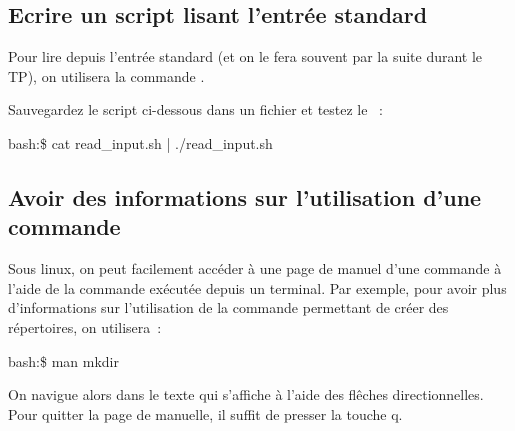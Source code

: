 \subsection{Ecrire un script lisant l'entrée standard}

Pour lire depuis l'entrée standard (et on le fera souvent par la suite durant le TP), on utilisera la commande \readcmd. 

\cprotect{}

Sauvegardez le script ci-dessous dans un fichier  et testez le ~:
\begin{exempleResultat}
bash:\$ cat read_input.sh | ./read\_input.sh
\end{exempleResultat}

\begin{center}

\end{center}

\subsection{Avoir des informations sur l'utilisation d'une commande}

Sous linux, on peut facilement accéder à une page de manuel d'une commande à l'aide de la commande \man exécutée depuis un terminal. Par exemple, pour avoir plus d'informations sur l'utilisation de la commande \mkdir permettant de créer des répertoires, on utilisera~:

\begin{exempleResultat}
bash:\$ man mkdir
\end{exempleResultat}
On navigue alors dans le texte qui s'affiche à l'aide des flêches directionnelles. Pour quitter la page de manuelle, il suffit de presser la touche q. 


\vfill 
\newpage
